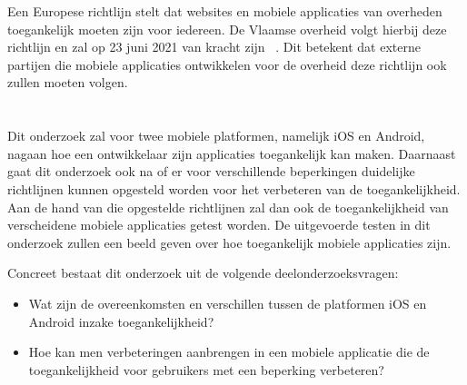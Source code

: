 Een Europese richtlijn stelt dat websites en mobiele applicaties van overheden toegankelijk moeten zijn voor iedereen. 
De Vlaamse overheid volgt hierbij deze richtlijn en zal op 23 juni 2021 van kracht zijn ~\autocite{vlaanderenVerplichting}. Dit betekent dat externe partijen die mobiele applicaties ontwikkelen voor de overheid deze richtlijn ook zullen moeten volgen. 


\section{}
\label{sec:onderzoeksvraag}



Dit onderzoek zal voor twee mobiele platformen, namelijk iOS en Android, nagaan hoe een ontwikkelaar zijn applicaties toegankelijk kan maken. Daarnaast gaat dit onderzoek ook na of er voor verschillende beperkingen duidelijke richtlijnen kunnen opgesteld worden voor het verbeteren van de toegankelijkheid. Aan de hand van die opgestelde richtlijnen zal dan ook de toegankelijkheid van verscheidene mobiele applicaties getest worden. De uitgevoerde testen in dit onderzoek zullen een beeld geven over hoe toegankelijk mobiele applicaties zijn.

Concreet bestaat dit onderzoek uit de volgende deelonderzoeksvragen:
\begin{itemize}
    \item Wat zijn de overeenkomsten en verschillen tussen de platformen iOS en Android inzake toegankelijkheid?
    \item Hoe kan men verbeteringen aanbrengen in een mobiele applicatie die de toegankelijkheid voor gebruikers met een beperking verbeteren?
\end{itemize}


